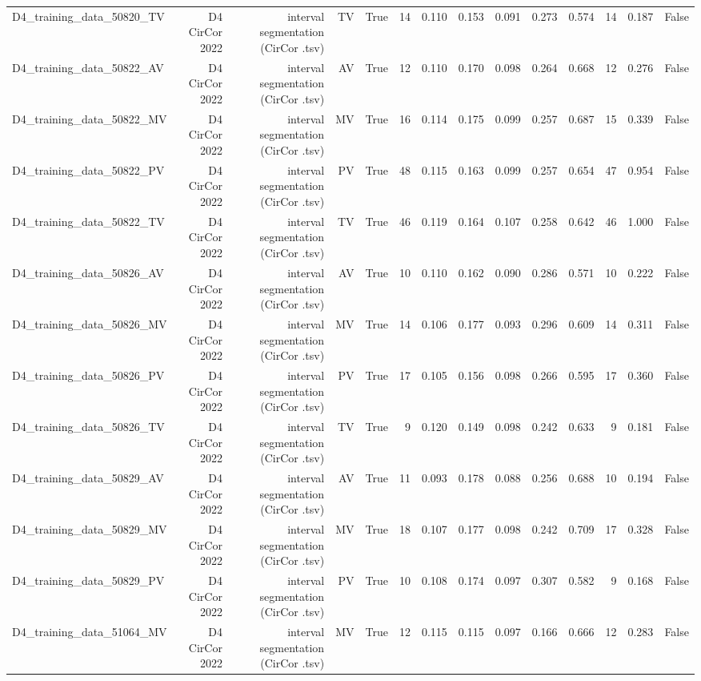 \begin{table}[htbp]
\begin{tabular}{lrrrrrrrrrrrrr}
    D4\_training\_data\_50820\_TV & D4 CirCor 2022 & interval segmentation (CirCor .tsv) & TV & True & 14 & 0.110 & 0.153 & 0.091 & 0.273 & 0.574 & 14 & 0.187 & False \\
    D4\_training\_data\_50822\_AV & D4 CirCor 2022 & interval segmentation (CirCor .tsv) & AV & True & 12 & 0.110 & 0.170 & 0.098 & 0.264 & 0.668 & 12 & 0.276 & False \\
    D4\_training\_data\_50822\_MV & D4 CirCor 2022 & interval segmentation (CirCor .tsv) & MV & True & 16 & 0.114 & 0.175 & 0.099 & 0.257 & 0.687 & 15 & 0.339 & False \\
    D4\_training\_data\_50822\_PV & D4 CirCor 2022 & interval segmentation (CirCor .tsv) & PV & True & 48 & 0.115 & 0.163 & 0.099 & 0.257 & 0.654 & 47 & 0.954 & False \\
    D4\_training\_data\_50822\_TV & D4 CirCor 2022 & interval segmentation (CirCor .tsv) & TV & True & 46 & 0.119 & 0.164 & 0.107 & 0.258 & 0.642 & 46 & 1.000 & False \\
    D4\_training\_data\_50826\_AV & D4 CirCor 2022 & interval segmentation (CirCor .tsv) & AV & True & 10 & 0.110 & 0.162 & 0.090 & 0.286 & 0.571 & 10 & 0.222 & False \\
    D4\_training\_data\_50826\_MV & D4 CirCor 2022 & interval segmentation (CirCor .tsv) & MV & True & 14 & 0.106 & 0.177 & 0.093 & 0.296 & 0.609 & 14 & 0.311 & False \\
    D4\_training\_data\_50826\_PV & D4 CirCor 2022 & interval segmentation (CirCor .tsv) & PV & True & 17 & 0.105 & 0.156 & 0.098 & 0.266 & 0.595 & 17 & 0.360 & False \\
    D4\_training\_data\_50826\_TV & D4 CirCor 2022 & interval segmentation (CirCor .tsv) & TV & True & 9 & 0.120 & 0.149 & 0.098 & 0.242 & 0.633 & 9 & 0.181 & False \\
    D4\_training\_data\_50829\_AV & D4 CirCor 2022 & interval segmentation (CirCor .tsv) & AV & True & 11 & 0.093 & 0.178 & 0.088 & 0.256 & 0.688 & 10 & 0.194 & False \\
    D4\_training\_data\_50829\_MV & D4 CirCor 2022 & interval segmentation (CirCor .tsv) & MV & True & 18 & 0.107 & 0.177 & 0.098 & 0.242 & 0.709 & 17 & 0.328 & False \\
    D4\_training\_data\_50829\_PV & D4 CirCor 2022 & interval segmentation (CirCor .tsv) & PV & True & 10 & 0.108 & 0.174 & 0.097 & 0.307 & 0.582 & 9 & 0.168 & False \\
    D4\_training\_data\_51064\_MV & D4 CirCor 2022 & interval segmentation (CirCor .tsv) & MV & True & 12 & 0.115 & 0.115 & 0.097 & 0.166 & 0.666 & 12 & 0.283 & False \\

\end{tabular}
\end{table}
